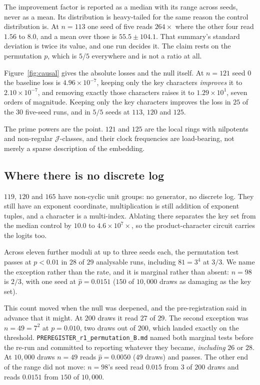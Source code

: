 The improvement factor is reported as a median with its range across seeds, never as a mean.
Its distribution is heavy-tailed for the same reason the control distribution is. At $n = 113$
one seed of five reads $264\times$ where the other four read $1.56$ to $8.0$, and a mean over
those is $55.5 \pm 104.1$. That summary's standard deviation is twice its value, and one run
decides it. The claim rests on the permutation $p$, which is $5/5$
everywhere and is not a ratio at all.

Figure~\ref{fig:causal} gives the absolute losses and the null itself. At $n = 121$
seed $0$ the baseline loss is $4.96 \times 10^{-7}$, keeping only the key characters
\emph{improves} it to $2.10 \times 10^{-7}$, and removing exactly those characters raises it to
$1.29 \times 10^{1}$, seven orders of magnitude.
Keeping only the key characters improves the loss in $25$ of the $30$ five-seed runs, and in
$5/5$ seeds at $113$, $120$ and $125$.

The prime powers are the point. $121$ and $125$ are the local rings with nilpotents
and non-regular $\mathcal{J}$-classes, and their clock frequencies are load-bearing,
not merely a sparse description of the embedding.

\subsection{Where there is no discrete log}
\label{sec:causal-nodlog}

$119$, $120$ and $165$ have non-cyclic unit groups: no generator, no discrete log. They still
have an exponent coordinate, multiplication is still addition of exponent tuples, and a
character is a multi-index. Ablating there separates the key set from the median control by $10.0$ to
$4.6 \times 10^{7}\times$, so the
product-character circuit carries the logits too.

Across eleven further moduli at up to three seeds each, the permutation test passes at
$p < 0.01$ in $28$ of $29$ analysable runs, including $81 = 3^{4}$ at $3/3$. We name the
exception rather than the rate, and it is marginal rather than absent: $n = 98$ is $2/3$, with
one seed at $\hat{p} = 0.0151$ ($150$ of $10{,}000$ draws as damaging as the key set).

This count moved when the null was deepened, and the pre-registration said in advance that it
might. At $200$ draws it read $27$ of $29$. The second exception was $n = 49 = 7^{2}$ at
$p = 0.010$, two draws out of $200$, which landed exactly on the threshold.
\texttt{PREREGISTER\_r1\_permutation\_B.md} named both marginal tests before the re-run and
committed to reporting whatever they became, \emph{including} $26$ or $28$. At $10{,}000$
draws $n = 49$ reads $\hat{p} = 0.0050$ ($49$ draws) and passes. The other end of the range
did not move: $n = 98$'s seed read $0.015$ from $3$ of $200$ draws and reads $0.0151$ from
$150$ of $10{,}000$.

